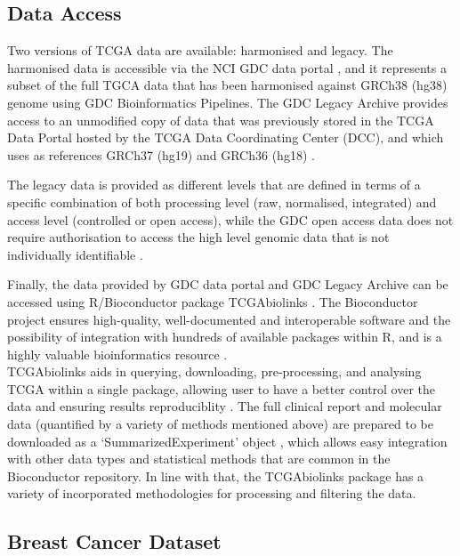     \subsection{Data Access}

    Two versions of TCGA data are available: harmonised and legacy. The harmonised data is accessible via the NCI GDC data portal \cite{NCICommons}, and it represents a subset of the full TGCA data that has been harmonised against GRCh38 (hg38) genome using GDC Bioinformatics Pipelines. The GDC Legacy Archive provides access to an unmodified copy of data that was previously stored in the TCGA Data Portal hosted by the TCGA Data Coordinating Center (DCC), and  which uses as references GRCh37 (hg19) and GRCh36 (hg18) \cite{Silva2016TCGAPackages}.

    The legacy data is provided as different levels that are defined in terms of a specific combination of both processing level (raw, normalised, integrated) and access level (controlled or open access), while the GDC open access data does not require authorisation to access the high level genomic data that is not individually identifiable \cite{NCICommons, Silva2016TCGAPackages}.
    
    Finally, the data provided by GDC data portal and GDC Legacy Archive can be accessed using R/Bioconductor package TCGAbiolinks \cite{Colaprico2016}. The Bioconductor project ensures high-quality, well-documented and interoperable software and the possibility of integration with hundreds of available packages within R, and is a highly valuable bioinformatics resource \cite{gentleman2004bioconductor}. \\TCGAbiolinks aids in querying, downloading, pre-processing, and analysing TCGA within a single package, allowing user to have a better control over the data and ensuring results reproduciblity \cite{Colaprico2016}. The full clinical report and molecular data (quantified by a variety of methods mentioned above) are prepared to be downloaded as a ‘SummarizedExperiment’ object \cite{Huber2015OrchestratingBioconductor}, which allows easy integration with other data types and statistical methods that are common in the Bioconductor repository.  In line with that, the TCGAbiolinks package has a variety of incorporated methodologies for processing and filtering the data.  
    
    \newpage
    \subsection{Breast Cancer Dataset}
    
